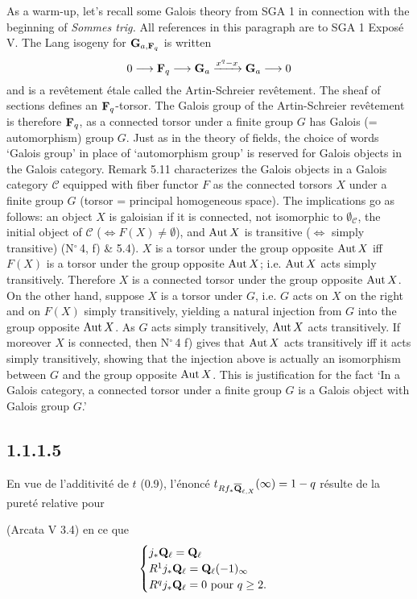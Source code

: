 \documentclass[deligne.tex]{subfiles}
\begin{document}
As a warm-up, let's recall some Galois theory from SGA 1 in connection with
the beginning of \emph{Sommes trig.} All references in this paragraph are to
SGA 1 Exposé V. The Lang isogeny for $\mathbf{G}_{a,\mathbf{F}_q}$ is written
\begin{equation*}
	0\longrightarrow\mathbf{F}_q\longrightarrow\mathbf{G}_a\xrightarrow{x^q-x}\mathbf{G}_a\longrightarrow0
\end{equation*}
and is a revêtement étale called the Artin-Schreier revêtement.
The sheaf of sections defines an $\mathbf{F}_q$-torsor.
The Galois group of the Artin-Schreier revêtement is therefore $\mathbf{F}_q$, as
a connected torsor under a finite group $G$ has Galois (= automorphism) group
$G$. Just as in the theory of fields, the choice of words `Galois group' in
place of `automorphism group' is reserved for Galois objects in the Galois
category. Remark 5.11 characterizes the Galois objects in a Galois category
$\mathscr C$ equipped with fiber functor $F$ as the connected torsors $X$
under a finite group $G$ (torsor = principal homogeneous space).
The implications go as follows: an object $X$ is galoisian if it is 
connected, not isomorphic to $\emptyset_{\mathscr C}$, the initial object of 
$\mathscr C$ ($\Leftrightarrow F(X)\ne\emptyset$), and $\operatorname{Aut} X$ is transitive 
($\Leftrightarrow$ simply transitive) (N$^\circ$\,4, f) \& 5.4).
$X$ is a torsor under the group opposite $\operatorname{Aut} X$ iff $F(X)$ is a torsor
under the group opposite $\operatorname{Aut} X$; i.e. $\operatorname{Aut} X$ acts simply transitively.
Therefore $X$ is a connected torsor under the group opposite $\operatorname{Aut} X$.
On the other hand, suppose $X$ is a torsor under $G$, i.e. $G$ acts on $X$ 
on the right and on $F(X)$ simply transitively, yielding a natural injection
from $G$ into the group opposite $\operatorname{Aut} X$.
As $G$ acts simply transitively, $\operatorname{Aut} X$ acts transitively.
If moreover $X$ is connected, then N$^\circ$\,4 f) gives that
$\operatorname{Aut} X$ acts transitively iff it acts simply transitively, showing that the
injection above is actually an isomorphism between $G$ and the group opposite
$\operatorname{Aut} X$. This is justification for the fact
`In a Galois category, a connected torsor under a finite group $G$ is a
Galois object with Galois group $G$.'

\subsection*{1.1.1.5} En vue de l'additivité de $t$ (0.9), l'énoncé
$t_{Rf_*\overline{\mathbf{Q}}_{\ell,X}}(\infty)=1-q$
résulte de la pureté relative pour
(Arcata V 3.4) en ce que
\begin{equation*}
	\begin{cases}
		j_*\mathbf{Q}_\ell=\mathbf{Q}_\ell \\
		R^1j_*\mathbf{Q}_\ell=\mathbf{Q}_\ell(-1)_\infty \\
		R^qj_*\mathbf{Q}_\ell=0 \text{ pour } q\geq2.
	\end{cases}
\end{equation*}
\end{document}

